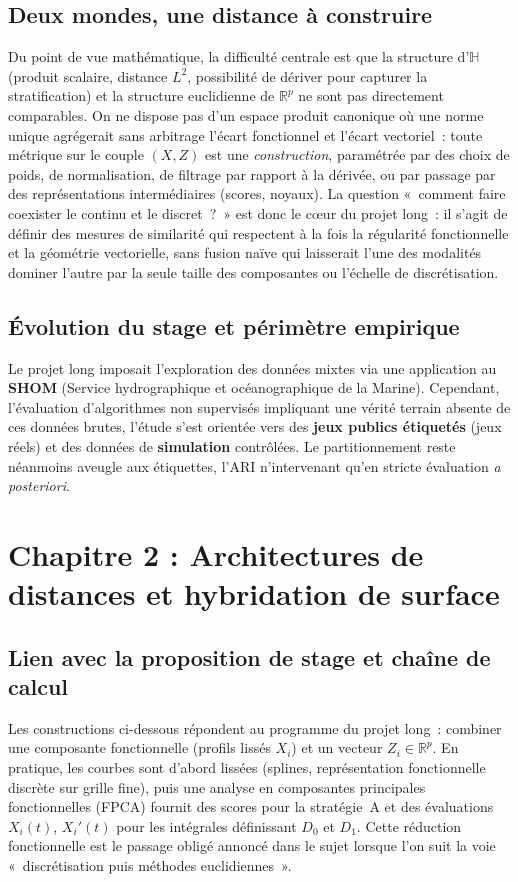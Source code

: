 \documentclass[11pt,a4paper]{article}
\begin{document}
\subsection{Deux mondes, une distance à construire}
Du point de vue mathématique, la difficulté centrale est que la structure
d'$\mathbb{H}$ (produit scalaire, distance $L^2$, possibilité de dériver pour
capturer la stratification) et la structure euclidienne de $\mathbb{R}^p$ ne
sont pas directement comparables. On ne dispose pas d'un espace produit canonique
où une norme unique agrégerait sans arbitrage l'écart fonctionnel et l'écart
vectoriel~: toute métrique sur le couple $(X,Z)$ est une \emph{construction},
paramétrée par des choix de poids, de normalisation, de filtrage par rapport à
la dérivée, ou par passage par des représentations intermédiaires (scores,
noyaux). La question «~comment faire coexister le continu et le discret~?~» est
donc le cœur du projet long~: il s'agit de définir des mesures de similarité
qui respectent à la fois la régularité fonctionnelle et la géométrie vectorielle,
sans fusion naïve qui laisserait l'une des modalités dominer l'autre par la
seule taille des composantes ou l'échelle de discrétisation.

\subsection{Évolution du stage et périmètre empirique}
Le projet long imposait l'exploration des données mixtes via une application au \textbf{SHOM} (Service hydrographique et océanographique de la Marine). Cependant, l'évaluation d'algorithmes non supervisés impliquant une vérité terrain absente de ces données brutes, l'étude s'est orientée vers des \textbf{jeux publics étiquetés} (jeux réels) et des données de \textbf{simulation} contrôlées. Le partitionnement reste néanmoins aveugle aux étiquettes, l'ARI n'intervenant qu'en stricte évaluation \emph{a posteriori}.

\section{Chapitre 2 : Architectures de distances et hybridation de surface}

\subsection{Lien avec la proposition de stage et chaîne de calcul}
Les constructions ci-dessous répondent au programme du projet long~: combiner
une composante fonctionnelle (profils lissés $X_i$) et un vecteur
$Z_i\in\mathbb{R}^p$. En pratique, les courbes sont d'abord lissées (splines,
représentation fonctionnelle discrète sur grille fine), puis une analyse en
composantes principales fonctionnelles (FPCA) fournit des scores pour la
stratégie~A et des évaluations $X_i(t)$, $X_i'(t)$ pour les
intégrales définissant $D_0$ et $D_1$. Cette réduction fonctionnelle est le
passage obligé annoncé dans le sujet lorsque l'on suit la voie «~discrétisation
puis méthodes euclidiennes~».
\end{document}
